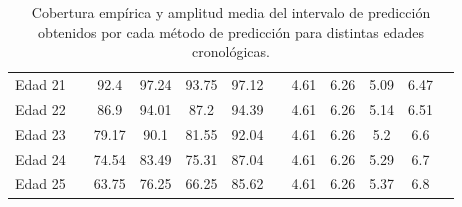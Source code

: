 \begin{table}[]
\begin{tabular}{cccccccccccc}
    Edad 21                          &  & 92.4          & 97.24        & 93.75       & 97.12        &  & 4.61                     & 6.26                    & 5.09                  & 6.47                   \\
    Edad 22                          &  & 86.9          & 94.01        & 87.2        & 94.39        &  & 4.61                     & 6.26                    & 5.14                  & 6.51                   \\
    Edad 23                          &  & 79.17         & 90.1         & 81.55       & 92.04        &  & 4.61                     & 6.26                    & 5.2                   & 6.6                    \\
    Edad 24                          &  & 74.54         & 83.49        & 75.31       & 87.04        &  & 4.61                     & 6.26                    & 5.29                  & 6.7                    \\
    Edad 25                          &  & 63.75         & 76.25        & 66.25       & 85.62        &  & 4.61                     & 6.26                    & 5.37                  & 6.8                    \\ 
    \bottomrule
    \end{tabular}
    \caption[
        Cobertura empírica y amplitud media del intervalo de predicción obtenidos por cada método de predicción para distintas edades cronológicas.
    ]{
        Cobertura empírica y amplitud media del intervalo de predicción obtenidos por cada método de predicción para distintas edades cronológicas.
    }
    \label{tab:AE_EC_by_true_age}
\end{table}




